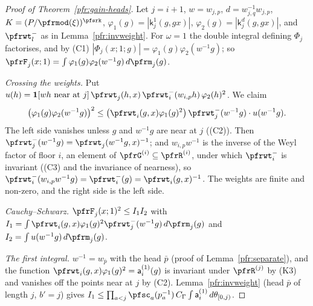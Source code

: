 \documentclass[10pt]{amsart}
\theoremstyle{definition}
\theoremstyle{remark}
\begin{document}
\begin{proof}[Proof of Theorem~\ref{pfr:gain-heads}]
Let $j=i+1$, $w=w_{j,p}$, $d=w_{j,q}^{-1}w_{j,p}$, $K=(P/\pfrmod(\xi))^{\pfsrk}$, $\varphi_1(g)=|\mathsf k^1_{j}(g,gx)|$, $\varphi_2(g)=|\mathsf k^d_{j}(g,
gx)|$, and $\pfrwt^-_l$ as in Lemma~\ref{pfr:invweight}. For $\omega=1$ the double integral defining $\Phi_j$ factorises, and by (C1)
$|\Phi_j(x;1;g)|=\varphi_1(g)\varphi_2(w^{-1}g)$; so $\pfrF_j(x;1)=\int\varphi_1(g)\varphi_2(w^{-1}g)\,d\pfrm_j(g)$.

\emph{Crossing the weights.} Put $u(h)=\mathbf 1[wh\text{ near at }j]\,\pfrwt_{j}(h,x)\,\pfrwt^-_i(w_{i,p}h)\,\varphi_2(h)^2$. We claim
\[
\bigl(\varphi_1(g)\varphi_2(w^{-1}g)\bigr)^2\le\bigl(\pfrwt_i(g,x)\varphi_1(g)^2\bigr)\,\pfrwt^-_j(w^{-1}g)\cdot u(w^{-1}g).
\]
The left side vanishes unless $g$ and $w^{-1}g$ are near at $j$ ((C2)). Then $\pfrwt^-_j(w^{-1}g)=\pfrwt_j(w^{-1}g,x)^{-1}$; and
$w_{i,p}w^{-1}$ is the inverse of the Weyl factor of floor $i$, an element of $\pfrG^{(i)}\subseteq\pfrR^{(i)}$, under which
$\pfrwt^-_i$ is invariant ((C3) and the invariance of nearness), so $\pfrwt^-_i(w_{i,p}w^{-1}g)=\pfrwt^-_i(g)=\pfrwt_i(g,x)^{-1}$. The
weights are finite and non-zero, and the right side is the left side.

\emph{Cauchy--Schwarz.} $\pfrF_j(x;1)^2\le I_1I_2$ with $I_1=\int\pfrwt_i(g,x)\varphi_1(g)^2\pfrwt^-_j(w^{-1}g)\,d\pfrm_j(g)$ and
$I_2=\int u(w^{-1}g)\,d\pfrm_j(g)$.

\emph{The first integral.} $w^{-1}=w_{\bar p}$ with the head $\bar p$ (proof of Lemma~\ref{pfr:separate}), and the function
$\pfrwt_i(g,x)\varphi_1(g)^2=\mathsf a^{(1)}_i(g)$ is invariant under $\pfrR^{(j)}$ by (K3) and vanishes off the points near at $j$ by (C2).
Lemma~\ref{pfr:invweight} (head $\bar p$ of length $j$, $b'=j$) gives $I_1\le\prod_{a<j}\pfsc_a(p_a^{-1})\,C_\Gamma\int\mathsf a^{(1)}_i\,d\theta_{[0,j)}$.


\end{proof}
\end{document}
